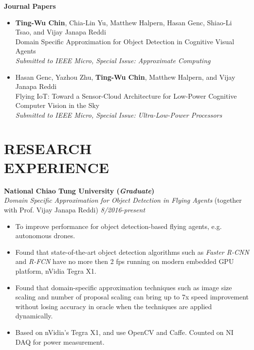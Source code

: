 \documentclass[margin, 9pt]{res} %
\begin{document}
\begin{resume}
{\large\textbf{Journal Papers}}

\begin{itemize}[leftmargin=*] \itemsep 0pt
	\item \textbf{Ting-Wu Chin}, Chia-Lin Yu, Matthew Halpern, Hasan Genc, Shiao-Li Tsao, and Vijay Janapa Reddi\\[2pt]
          Domain Specific Approximation for Object Detection in Cognitive Visual Agents\\
          \textit{Submitted to IEEE Micro, Special Issue: Approximate Computing}
	\item Hasan Genc, Yazhou Zhu, \textbf{Ting-Wu Chin}, Matthew Halpern, and Vijay Janapa Reddi\\[2pt]
          Flying IoT: Toward a Sensor-Cloud Architecture for Low-Power Cognitive Computer Vision in the Sky\\
          \textit{Submitted to IEEE Micro, Special Issue: Ultra-Low-Power Processors}
\end{itemize}


\section{RESEARCH\\ EXPERIENCE}

{\large\textbf{National Chiao Tung University (\textit{Graduate})}}\\


{\large\textit{Domain Specific Approximation for Object Detection in Flying Agents} (together with Prof. Vijay Janapa Reddi)} \hfill\textit{8/2016-present}\\
\vspace*{-7pt}
\begin{itemize}[leftmargin=*] \itemsep -3pt
\vspace*{-5pt}
  \item To improve performance for object detection-based flying agents, e.g.
  autonomous drones.
  \item Found that state-of-the-art object detection algorithms such as
  \textit{Faster R-CNN} and \textit{R-FCN} have no more then 2 fps running on
  modern embedded GPU platform, nVidia Tegra X1.
	\item Found that domain-specific approximation techniques such as image size
  scaling and number of proposal scaling can bring up to 7x speed improvement
  without losing accuracy in oracle when the techniques are applied dynamically.
  \item Based on nVidia's Tegra X1, and use OpenCV and Caffe. Counted on NI DAQ
  for power measurement.
\end{itemize}
\vspace*{-7pt}


\end{resume}
\end{document}
